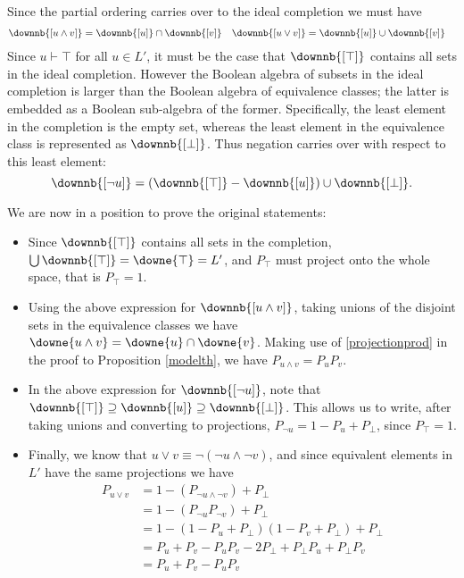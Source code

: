 Since the partial ordering carries over to the ideal completion we must have
\begin{align*}
\downnb{[u\land v]} &= \downnb{[u]} \cap \downnb{[v]}
& \downnb{[u\lor v]} &= \downnb{[u]} \cup \downnb{[v]}
\end{align*}
Since $u \vdash \top$ for all $u\in L'$, it must be the case that $\downnb{[\top]}$ contains all sets in the ideal completion. However the Boolean algebra of subsets in the ideal completion is larger than the Boolean algebra of equivalence classes; the latter is embedded as a Boolean sub-algebra of the former. Specifically, the least element in the completion is the empty set, whereas the least element in the equivalence class is represented as $\downnb{[\bot]}$. Thus negation carries over with respect to this least element:
$$\downnb{[\lnot u]} = (\downnb{[\top]} - \downnb{[u]})\cup \downnb{[\bot]}.$$

We are now in a position to prove the original statements:
\begin{itemize}
\item Since $\downnb{[\top]}$ contains all sets in the completion, $\bigcup\downnb{[\top]} = \downe{\top} = L'$, and $P_\top$ must project onto the whole space, that is $P_\top = 1$.
\item Using the above expression for $\downnb{[u \land v]}$, taking unions of the disjoint sets in the equivalence classes we have $\downe{u\land v} = \downe{u} \cap \downe{v}$. Making use of \eqref{projectionprod} in the proof to Proposition \ref{modelth}, we have $P_{u\land v} = P_uP_v$.
\item In the above expression for $\downnb{[\lnot u]}$, note that $\downnb{[\top]} \supseteq \downnb{[u]} \supseteq{\downnb{[\bot]}}$. This allows us to write, after taking unions and converting to projections, $P_{\lnot u} = 1 - P_u + P_\bot$, since $P_\top = 1$.
\item Finally, we know that $u\lor v \equiv \lnot(\lnot u \land \lnot v)$, and since equivalent elements in $L'$ have the same projections we have
\begin{align*}
P_{u\lor v} &= 1 - (P_{\lnot u \land \lnot v}) + P_\bot\\
		&= 1 - (P_{\lnot u}P_{\lnot v}) + P_\bot\\
		&= 1 - (1 - P_u + P_\bot)(1 - P_v + P_\bot) + P_\bot\\
		&= P_u + P_v - P_u P_v - 2P_\bot + P_\bot P_u + P_\bot P_v\\
		&= P_u + P_v - P_u P_v
\end{align*}
\end{itemize}

